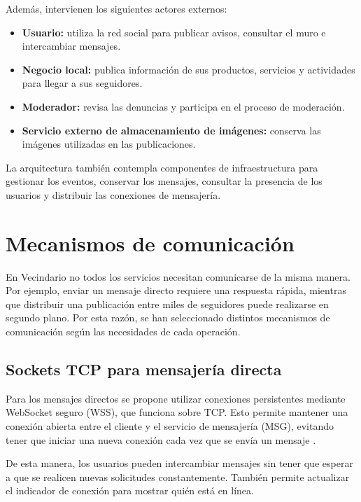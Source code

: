 \documentclass[12pt,a4paper]{article}
\begin{document}
Además, intervienen los siguientes actores externos:

\begin{itemize}
    \item \textbf{Usuario:} utiliza la red social para publicar avisos, consultar el muro e intercambiar mensajes.
    \item \textbf{Negocio local:} publica información de sus productos, servicios y actividades para llegar a sus seguidores.
    \item \textbf{Moderador:} revisa las denuncias y participa en el proceso de moderación.
    \item \textbf{Servicio externo de almacenamiento de imágenes:} conserva las imágenes utilizadas en las publicaciones.
\end{itemize}

La arquitectura también contempla componentes de infraestructura para gestionar los eventos, conservar los mensajes, consultar la presencia de los usuarios y distribuir las conexiones de mensajería.

\section{Mecanismos de comunicación}

En Vecindario no todos los servicios necesitan comunicarse de la misma manera. Por ejemplo, enviar un mensaje directo requiere una respuesta rápida, mientras que distribuir una publicación entre miles de seguidores puede realizarse en segundo plano. Por esta razón, se han seleccionado distintos mecanismos de comunicación según las necesidades de cada operación.

\subsection{Sockets TCP para mensajería directa}

Para los mensajes directos se propone utilizar conexiones persistentes mediante WebSocket seguro (WSS), que funciona sobre TCP. Esto permite mantener una conexión abierta entre el cliente y el servicio de mensajería (MSG), evitando tener que iniciar una nueva conexión cada vez que se envía un mensaje \cite{websocket}.

De esta manera, los usuarios pueden intercambiar mensajes sin tener que esperar a que se realicen nuevas solicitudes constantemente. También permite actualizar el indicador de conexión para mostrar quién está en línea.
\end{document}
